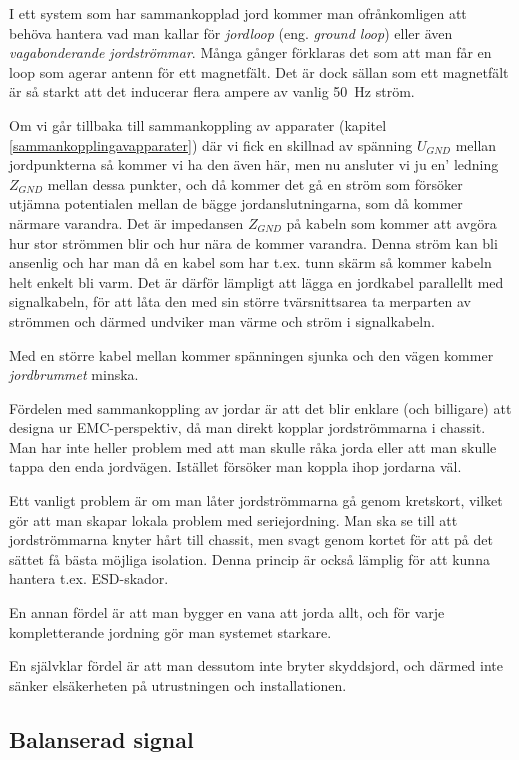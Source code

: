 I ett system som har sammankopplad jord kommer man ofrånkomligen att behöva
hantera vad man kallar för \emph{jordloop} (eng. \emph{ground loop}) eller även
\emph{vagabonderande jordströmmar}.
Många gånger förklaras det som att man får en loop som agerar antenn för ett
magnetfält.
Det är dock sällan som ett magnetfält är så starkt att det inducerar flera
ampere av vanlig 50~Hz ström.

Om vi går tillbaka till sammankoppling av apparater (kapitel
\ref{sammankopplingavapparater}) där vi fick en skillnad av spänning \(U_{GND}\)
mellan jordpunkterna så kommer vi ha den även här, men nu ansluter vi ju en'
ledning \(Z_{GND}\) mellan dessa punkter, och då kommer det gå en ström som
försöker utjämna potentialen mellan de bägge jordanslutningarna, som då kommer
närmare varandra.
Det är impedansen \(Z_{GND}\) på kabeln som kommer att avgöra hur stor strömmen
blir och hur nära de kommer varandra.
Denna ström kan bli ansenlig och har man då en kabel som har t.ex. tunn skärm
så kommer kabeln helt enkelt bli varm.
Det är därför lämpligt att lägga en jordkabel parallellt med signalkabeln, för
att låta den med sin större tvärsnittsarea ta merparten av strömmen och därmed
undviker man värme och ström i signalkabeln.

Med en större kabel mellan kommer spänningen sjunka och den vägen kommer
\emph{jordbrummet} minska.

Fördelen med sammankoppling av jordar är att det blir enklare (och billigare)
att designa ur EMC-perspektiv, då man direkt kopplar jordströmmarna i chassit.
Man har inte heller problem med att man skulle råka jorda eller att man skulle
tappa den enda jordvägen.
Istället försöker man koppla ihop jordarna väl.

Ett vanligt problem är om man låter jordströmmarna gå genom kretskort, vilket
gör att man skapar lokala problem med seriejordning.
Man ska se till att jordströmmarna knyter hårt till chassit, men svagt genom
kortet för att på det sättet få bästa möjliga isolation.
Denna princip är också lämplig för att kunna hantera t.ex. ESD-skador.

En annan fördel är att man bygger en vana att jorda allt, och för varje
kompletterande jordning gör man systemet starkare.

En självklar fördel är att man dessutom inte bryter skyddsjord, och därmed inte
sänker elsäkerheten på utrustningen och installationen.

\subsection{Balanserad signal}

